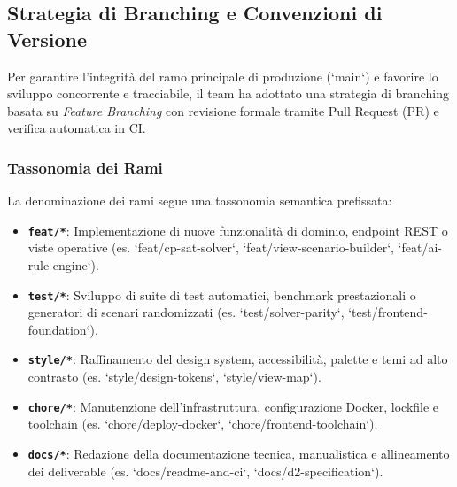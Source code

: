 \subsection{Strategia di Branching e Convenzioni di Versione}
Per garantire l'integrità del ramo principale di produzione (`main`) e favorire lo sviluppo concorrente e tracciabile, il team ha adottato una strategia di branching basata su \emph{Feature Branching} con revisione formale tramite Pull Request (PR) e verifica automatica in CI.

\subsubsection{Tassonomia dei Rami}
La denominazione dei rami segue una tassonomia semantica prefissata:
\begin{itemize}[leftmargin=1.5em, itemsep=0.2em]
    \item \textbf{\texttt{feat/*}}: Implementazione di nuove funzionalità di dominio, endpoint REST o viste operative (es. `feat/cp-sat-solver`, `feat/view-scenario-builder`, `feat/ai-rule-engine`).
    \item \textbf{\texttt{test/*}}: Sviluppo di suite di test automatici, benchmark prestazionali o generatori di scenari randomizzati (es. `test/solver-parity`, `test/frontend-foundation`).
    \item \textbf{\texttt{style/*}}: Raffinamento del design system, accessibilità, palette e temi ad alto contrasto (es. `style/design-tokens`, `style/view-map`).
    \item \textbf{\texttt{chore/*}}: Manutenzione dell'infrastruttura, configurazione Docker, lockfile e toolchain (es. `chore/deploy-docker`, `chore/frontend-toolchain`).
    \item \textbf{\texttt{docs/*}}: Redazione della documentazione tecnica, manualistica e allineamento dei deliverable (es. `docs/readme-and-ci`, `docs/d2-specification`).
\end{itemize}

